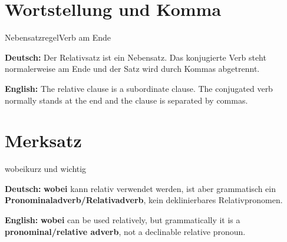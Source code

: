 \documentclass[a4paper,11pt]{article}
\newcommand{\GermanText}[1]{\textbf{Deutsch: }#1\par}
\newcommand{\EnglishText}[1]{{\small\color{SoftGray}\textbf{English: }#1\par}}
\begin{document}
\section{Wortstellung und Komma}

\begin{grammarentry}{Nebensatzregel}{Verb am Ende}

\GermanText{Der Relativsatz ist ein Nebensatz. Das konjugierte Verb steht normalerweise am Ende und der Satz wird durch Kommas abgetrennt.}

\EnglishText{The relative clause is a subordinate clause. The conjugated verb normally stands at the end and the clause is separated by commas.}

\end{grammarentry}

\section{Merksatz}

\begin{grammarentry}{wobei}{kurz und wichtig}

\GermanText{\textbf{wobei} kann relativ verwendet werden, ist aber grammatisch ein \textbf{Pronominaladverb/Relativadverb}, kein deklinierbares Relativpronomen.}

\EnglishText{\textbf{wobei} can be used relatively, but grammatically it is a \textbf{pronominal/relative adverb}, not a declinable relative pronoun.}

\end{grammarentry}
\end{document}
